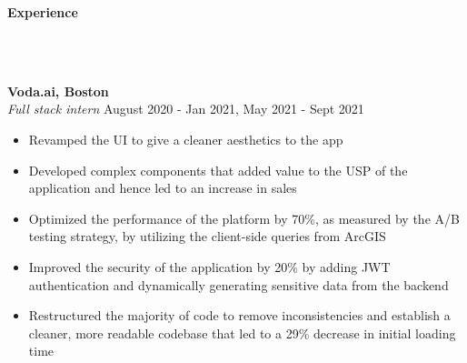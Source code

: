 \documentclass[]{article}
\newcommand{\lineunder} {
    \vspace*{-8pt} \\
    \hrulefill \\
}
\newcommand{\header} [1] {
    {\vspace*{6pt} \fontsize{12}{12}\selectfont \textbf{#1}}
     \lineunder
}
\begin{document}
\header{Experience}
\vspace{1mm}

\hspace{1mm}
\textbf{Voda.ai, Boston}\\
\hspace{1mm}
\textit{Full stack intern} \hfill August 2020 - Jan 2021, May 2021 - Sept 2021\\
\vspace{-3mm}
\begin{itemize}
    \setlength\itemsep{-1mm}
    \item Revamped the UI to give a cleaner aesthetics to the app
    \item Developed complex components that added value to the USP of the application and hence led to an increase in sales
    \item Optimized the performance of the platform by 70\%, as measured by the A/B testing strategy, by utilizing the client-side queries from ArcGIS
    \item Improved the security of the application by 20\% by adding JWT authentication and dynamically generating sensitive data from the backend
    \item Restructured the majority of code to remove inconsistencies and establish a cleaner, more readable codebase that led to a 29\% decrease in initial loading time
\end{itemize}
\vspace{-2mm}
\end{document}
